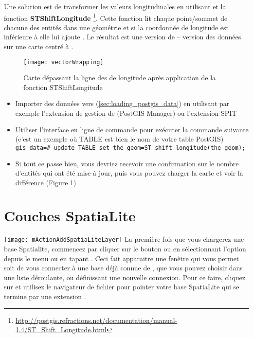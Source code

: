 Une solution est de transformer les valeurs longitudinales en utilisant \pg et la fonction \textbf{ST\textunderscore Shift\textunderscore Longitude}
\footnote{\url{http://postgis.refractions.net/documentation/manual-1.4/ST_Shift_Longitude.html}}. Cette fonction lit chaque point/sommet de chacune des entités dans une géométrie et si la coordonnée de longitude est inférieure à  elle lui ajoute . Le résultat est une version de  --  version des données sur une carte centré à .

\begin{figure}[ht]
   \begin{center}
   
   \texttt{[image: vectorWrapping]}
   \caption{Carte dépassant la ligne des  de longitude après application de la fonction ST\textunderscore Shift\textunderscore Longitude}
\label{fig:vector_wrapping}
\end{center}
\end{figure}


\begin{itemize}[label=--]
\item Importer des données vers \pg (\ref{sec:loading_postgis_data}) en utilisant par exemple l'extension de gestion de \pg (PostGIS Manager) ou l'extension SPIT
\item Utiliser l'interface en ligne de commande \pg pour exécuter la commande suivante (c'est un exemple où TABLE est bien le nom de votre table PostGIS) \\ 
\texttt{gis\_data=\# update TABLE set the\_geom=ST\_shift\_longitude(the\_geom);} 
\item Si tout ce passe bien, vous devriez recevoir une confirmation sur le nombre d'entités qui ont été mise à jour, puis vous pouvez charger la carte et voir la différence (Figure \ref{fig:vector_wrapping})
\end{itemize}

\section{Couches SpatiaLite} 
\label{label_spatialite} 

\texttt{[image: mActionAddSpatiaLiteLayer]}
La première fois que vous chargerez une base Spatialite, commencez par cliquer sur le bouton  ou en sélectionnant l'option\\  depuis le menu  ou en tapant . Ceci fait apparaitre une fenêtre qui vous permet soit de vous connecter à une base déjà connue de \qg, que vous pouvez choisir dans une liste déroulante, ou définissant une nouvelle connexion. Pour ce faire, cliquez sur  et utilisez le navigateur de fichier pour pointer votre base SpatiaLite qui se termine par une extension .

